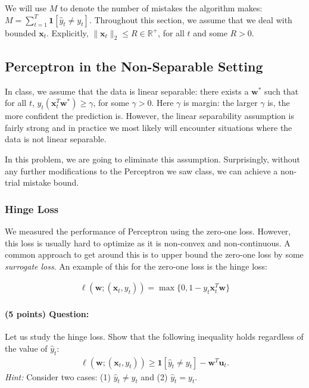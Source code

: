 \documentclass{article}
\begin{document}
We will use $M$ to denote the number of mistakes the algorithm makes: $M = \sum_{t=1}^T \mathbf{1}[\hat{y}_t \neq y_t]$. Throughout this section, we assume that we deal with bounded $\mathbf{x}_t$. Explicitly, $\|\mathbf{x}_t\|_2\leq R\in\mathbb{R}^+$, for all $t$ and some $R > 0$.


\subsection{Perceptron in the Non-Separable Setting}

In class, we assume that the data is linear separable: there exists a $\mathbf{w}^*$ such that for all $t$, ${y}_t (\mathbf{x}_t^T \mathbf{w}^*) \geq \gamma$, for some $\gamma > 0$. Here $\gamma$ is margin: the larger $\gamma$ is, the more confident the prediction is. However, the linear separability assumption is fairly strong and in practice we most likely will encounter situations where the data is not linear separable. 

In this problem, we are going to eliminate this assumption.
Surprisingly, without any further modifications to the Perceptron we saw class, we can achieve a non-trial mistake bound.

\subsubsection{Hinge Loss}

We measured the performance of Perceptron using the zero-one loss.
However, this loss is usually hard to optimize as it is non-convex and non-continuous.
A common approach to get around this is to upper bound the zero-one loss by some \emph{surrogate loss}.
An example of this for the zero-one loss is the hinge loss:

\begin{align}
    \ell(\mathbf{w}; (\mathbf{x}_t,y_t)) = \max\{0, 1 - y_t \mathbf{x}_t^T\mathbf{w}\}
\end{align}

\paragraph{(5 points) Question:} 

Let us study the hinge loss. Show that the following inequality holds regardless of the value of $\hat{y}_t$:
\begin{align}
\label{eq:hinge_loss}
    \ell(\mathbf{w}; (\mathbf{x}_t, y_t)) \geq \mathbf{1}[\hat{y}_t\neq y_t]  - \mathbf{w}^T \mathbf{u}_t.
\end{align}
\textit{Hint:} Consider two cases: (1) $\hat{y}_t\neq y_t$ and (2) $\hat{y}_t = y_t$.
\end{document}
